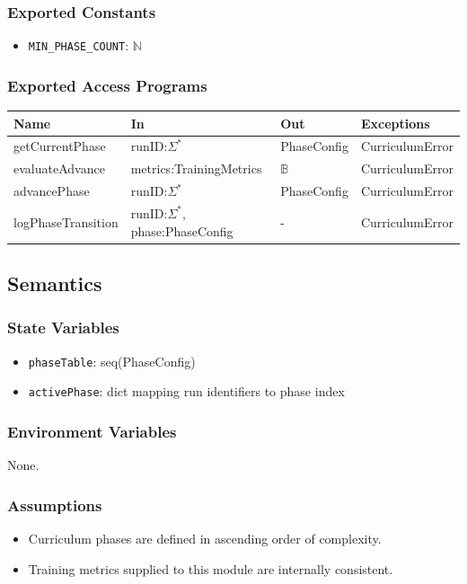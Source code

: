 \documentclass[12pt, titlepage]{article}
\begin{document}
\subsubsection{Exported Constants}
\begin{itemize}
\item \texttt{MIN\_PHASE\_COUNT}: $\mathbb{N}$
\end{itemize}

\subsubsection{Exported Access Programs}
\begin{center}
\begin{tabular}{p{5cm} p{4cm} p{4cm} p{3cm}}
\hline
\textbf{Name} & \textbf{In} & \textbf{Out} & \textbf{Exceptions} \\
\hline
getCurrentPhase & runID:$\Sigma^*$ & PhaseConfig & CurriculumError \\
evaluateAdvance & metrics:TrainingMetrics & $\mathbb{B}$ & CurriculumError \\
advancePhase & runID:$\Sigma^*$ & PhaseConfig & CurriculumError \\
logPhaseTransition & runID:$\Sigma^*$, phase:PhaseConfig & - & CurriculumError \\
\hline
\end{tabular}
\end{center}

\subsection{Semantics}

\subsubsection{State Variables}
\begin{itemize}
\item \texttt{phaseTable}: seq(PhaseConfig)
\item \texttt{activePhase}: dict mapping run identifiers to phase index
\end{itemize}

\subsubsection{Environment Variables}
None.

\subsubsection{Assumptions}
\begin{itemize}
    \item Curriculum phases are defined in ascending order of complexity.
    \item Training metrics supplied to this module are internally consistent.
\end{itemize}
\end{document}
